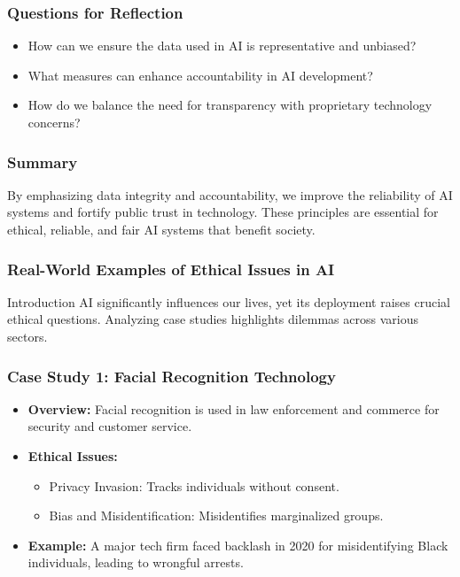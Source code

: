 \documentclass[aspectratio=169]{beamer}
\begin{document}
\begin{frame}[fragile]
    \frametitle{Questions for Reflection}
    \begin{itemize}
        \item How can we ensure the data used in AI is representative and unbiased?
        \item What measures can enhance accountability in AI development?
        \item How do we balance the need for transparency with proprietary technology concerns?
    \end{itemize}
\end{frame}

\begin{frame}[fragile]
    \frametitle{Summary}
    By emphasizing data integrity and accountability, we improve the reliability of AI systems and fortify public trust in technology. These principles are essential for ethical, reliable, and fair AI systems that benefit society.
\end{frame}

\begin{frame}[fragile]
    \frametitle{Real-World Examples of Ethical Issues in AI}
    \begin{block}{Introduction}
        AI significantly influences our lives, yet its deployment raises crucial ethical questions.
        Analyzing case studies highlights dilemmas across various sectors.
    \end{block}
\end{frame}

\begin{frame}[fragile]
    \frametitle{Case Study 1: Facial Recognition Technology}
    \begin{itemize}
        \item \textbf{Overview:} 
        Facial recognition is used in law enforcement and commerce for security and customer service.

        \item \textbf{Ethical Issues:}
        \begin{itemize}
            \item Privacy Invasion: Tracks individuals without consent.
            \item Bias and Misidentification: Misidentifies marginalized groups.
        \end{itemize}
        
        \item \textbf{Example:} 
        A major tech firm faced backlash in 2020 for misidentifying Black individuals, leading to wrongful arrests.
    \end{itemize}
\end{frame}
\end{document}
